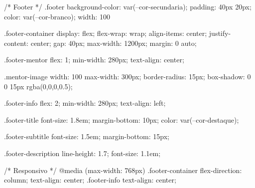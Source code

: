 /* Footer */
.footer {
    background-color: var(--cor-secundaria);
    padding: 40px 20px;
    color: var(--cor-branco);
    width: 100%
}

.footer-container {
    display: flex;
    flex-wrap: wrap;
    align-items: center;
    justify-content: center;
    gap: 40px;
    max-width: 1200px;
    margin: 0 auto;
}

.footer-mentor {
    flex: 1;
    min-width: 280px;
    text-align: center;
}

.mentor-image {
    width: 100%
    max-width: 300px;
    border-radius: 15px;
    box-shadow: 0 0 15px rgba(0,0,0,0.5);
}

.footer-info {
    flex: 2;
    min-width: 280px;
    text-align: left;
}

.footer-title {
    font-size: 1.8em;
    margin-bottom: 10px;
    color: var(--cor-destaque);
}

.footer-subtitle {
    font-size: 1.5em;
    margin-bottom: 15px;
}

.footer-description {
    line-height: 1.7;
    font-size: 1.1em;
}

/* Responsivo */
@media (max-width: 768px) {
    .footer-container {
        flex-direction: column;
        text-align: center;
    }
    .footer-info {
        text-align: center;
    }
}
